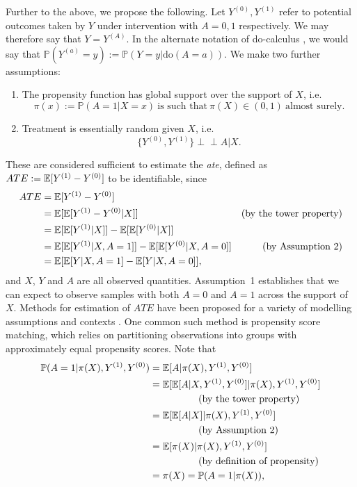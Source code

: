 \documentclass[../thesis.tex]{subfiles}
\begin{document}
Further to the above, we propose the following. Let $Y^{(0)}, Y^{(1)}$ refer to potential outcomes taken by $Y$ under intervention with $A=0,1$
respectively. We may therefore say that $Y=Y^{(A)}$. In the alternate notation of do-calculus \citep{pearl_causal_1995, pearl_-calculus_2012}, we would say that $\mathbb{P}(Y^{(a)} = y) := \mathbb{P}(Y = y |  \text{do}(A=a))$. We make two further assumptions: 
\begin{enumerate}
    \item The propensity function has global support over the support of $X$, i.e. 
    \[\pi(x) := \mathbb{P}(A=1 | X = x) \  \text{is such that} \ \pi(X) \in (0,1) \ \text{almost surely.}\]
    \item Treatment is essentially random given $X$, i.e.
    \[\{Y^{(0)}, Y^{(1)}\} \perp\!\!\!\perp A | X. \]
\end{enumerate}
These are considered sufficient to estimate the \emph{\gls{ate}}, defined as $ATE := \mathbb{E}[Y^{(1)} -Y^{(0)}]$ to be identifiable, since 
\begin{align*}
    ATE & = \mathbb{E}[Y^{(1)} - Y^{(0)} ] & \\
    & = \mathbb{E}[\mathbb{E}[Y^{(1)} - Y^{(0)} | X]] & \text{(by the tower property)} \\
    & = \mathbb{E}[\mathbb{E}[Y^{(1)} | X]] - \mathbb{E}[\mathbb{E}[Y^{(0)} | X]] & \\ 
    & = \mathbb{E}[\mathbb{E}[Y^{(1)} | X, A = 1]] - \mathbb{E}[\mathbb{E}[Y^{(0)} | X, A = 0]] & \text{(by Assumption~2)} \\
    & = \mathbb{E}[\mathbb{E}[Y | X, A = 1] - \mathbb{E}[Y | X, A = 0]], & \label{eq:ate}
\end{align*}
and $X$, $Y$ and $A$ are all observed quantities. Assumption~1 establishes that we can expect to observe samples with both $A=0$ and $A=1$ across the support of $X$. Methods for estimation of $ATE$ have been proposed for a variety of modelling assumptions and contexts \citep{reiersol_confluence_1945, thistlethwaite_regression-discontinuity_1960, rosenbaum_central_1983, abadie_semiparametric_2005, craig_natural_2017, roth_whats_2023}. One common such method is propensity score matching, which relies on partitioning observations into groups with approximately equal propensity scores. Note that 
\begin{align*}
    \mathbb{P}(A=1 | \pi(X), Y^{(1)}, Y^{(0)}) & = \mathbb{E}[A | \pi(X), Y^{(1)}, Y^{(0)}]  \\
    & = \mathbb{E}[\mathbb{E}[A | X, Y^{(1)}, Y^{(0)}] | \pi(X), Y^{(1)}, Y^{(0)}] \\
    & \hspace{50pt} \text{(by the tower property)}\\
    & = \mathbb{E}[\mathbb{E}[A|X]|\pi(X), Y^{(1)}, Y^{(0)}] \\ & \hspace{50pt} \text{(by Assumption~2)} \\
    & = \mathbb{E}[\pi(X) | \pi(X), Y^{(1)}, Y^{(0)}] 
 \\ & \hspace{50pt} \text{(by definition of propensity)} \\
    & = \pi(X) = \mathbb{P}(A=1|\pi(X)), 
\end{align*}
\end{document}
